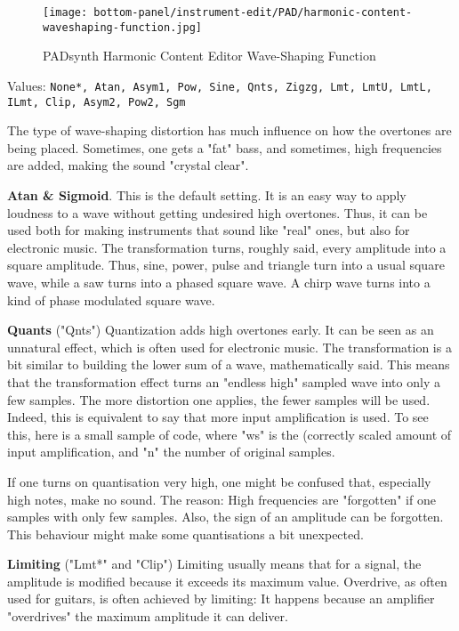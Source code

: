 \begin{figure}[H]
   \centering
   \texttt{[image: bottom-panel/instrument-edit/PAD/harmonic-content-waveshaping-function.jpg]}
   \caption{PADsynth Harmonic Content Editor Wave-Shaping Function}
   \label{fig:padsynth_harmonic_content_editor_waveshaping_function}
\end{figure}

   Values: \texttt{None*, Atan, Asym1, Pow, Sine, Qnts, Zigzg, Lmt,
              LmtU, LmtL, ILmt, Clip, Asym2, Pow2, Sgm}

   The type of wave-shaping distortion has much influence on how the
   overtones are being placed. Sometimes, one gets a "fat" bass, and
   sometimes, high frequencies are added, making the sound "crystal clear".

   \textbf{Atan \& Sigmoid}.
   This is the default setting. It is an easy way to apply loudness to a wave
   without getting undesired high overtones. Thus, it can be used both for
   making instruments that sound like "real" ones, but also for electronic
   music. The transformation turns, roughly said, every amplitude into a
   square amplitude. Thus, sine, power, pulse and triangle turn into a usual
   square wave, while a saw turns into a phased square wave. A chirp wave
   turns into a kind of phase modulated square wave.

   \textbf{Quants} ("Qnts")
   Quantization adds high overtones early. It can be seen as an unnatural
   effect, which is often used for electronic music.  The transformation is a
   bit similar to building the lower sum of a wave, mathematically said. This
   means that the transformation effect turns an "endless high" sampled
   wave into only a few samples. The more distortion one applies, the fewer
   samples will be used. Indeed, this is equivalent to say that more input
   amplification is used. To see this, here is a small sample of code, where
   "ws" is the (correctly scaled amount of input amplification, and "n" the
   number of original samples.

   If one turns on quantisation very high, one might be confused that,
   especially high notes, make no sound. The reason: High frequencies are
   "forgotten" if one samples with only few samples. Also, the sign of an
   amplitude can be forgotten. This behaviour might make some quantisations a
   bit unexpected.

   \textbf{Limiting} ("Lmt*" and "Clip")
   Limiting usually means that for a signal, the amplitude is modified
   because it exceeds its maximum value. Overdrive, as often used for
   guitars, is often achieved by limiting: It happens because an amplifier
   "overdrives" the maximum amplitude it can deliver.


